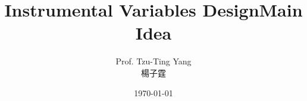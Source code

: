 \documentclass[dvipsnames,hyperref={pdfpagelabels=false}]{beamer}
\title[]  
{Instrumental Variables Design}
\author 
{Prof. Tzu-Ting Yang  \\ 楊子霆}
\institute{Institute of Economics, Academia Sinica  \\ 中央研究院經濟研究所}
\date
{\today}
\begin{document}
\begin{frame}{}
 \titlepage
\end{frame}




\title[]  
{Main Idea}


\author 
{}

\institute{}






\date
{}


\begin{frame}{}
	\titlepage
\end{frame}
\end{document}
